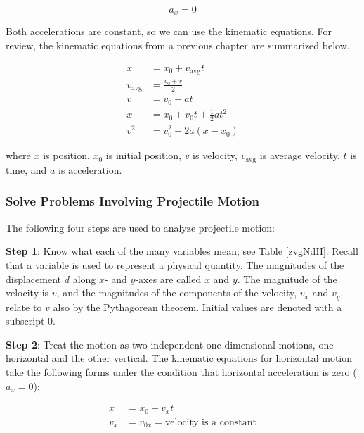 \documentclass[main-physics.tex]{subfiles}
\begin{document}
\begin{equation}
    a_x = 0
\end{equation}

Both accelerations are constant, so we can use the kinematic equations. For review, the kinematic equations from a previous chapter are summarized below.

\begin{align}
    x &= x_0 + v_{\text{avg}} t\\[0.5ex]
    v_{\text{avg}} &= \frac{v_0 + v}{2}\\[0.5ex]
    v &= v_0 + a t\\[0.5ex]
    x &= x_0 + v_0 t + \frac{1}{2} a t^2\\[0.5ex]
    v^2 &= v_0^2 + 2 a (x - x_0)
\end{align}

where $x$ is position, $x_0$ is initial position, $v$ is velocity, $v_{\text{avg}}$ is average velocity, $t$ is time, and $a$ is acceleration.

\subsubsection*{Solve Problems Involving Projectile Motion}

The following four steps are used to analyze projectile motion:

\vspace{1em}

\textbf{Step 1}: Know what each of the many variables mean; see Table \ref{zvgNdH}. Recall that a variable is used to represent a physical quantity. The magnitudes of the displacement $d$ along $x$- and $y$-axes are called $x$ and  $y$. The magnitude of the velocity is $v$, and the magnitudes of the components of the velocity, $v_x$ and $v_y$, relate to $v$ also by the Pythagorean theorem. Initial values are denoted with a subscript 0.

\vspace{1em}

\textbf{Step 2}: Treat the motion as two independent one dimensional motions, one horizontal and the other vertical. The kinematic equations for horizontal motion take the following forms under the condition that horizontal acceleration is zero ($a_x = 0$):

\begin{align}
    x &= x_0 + v_x t \label{7fMAPG}\\[0.5ex]
    v_x &= v_{0x} = \text{velocity is a constant} \label{dCvDf4}
\end{align}
\end{document}
